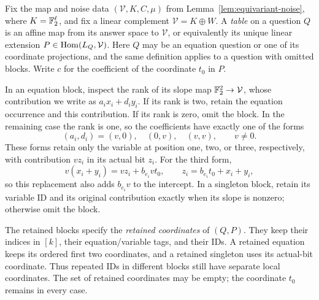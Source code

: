 Fix the map and noise data \((\mathcal V,K,C,\mu)\) from
Lemma~\ref{lem:equivariant-noise}, where \(K=\mathbb F_2^\ell\), and fix a linear
complement \(\mathcal V=K\oplus W\).  A \emph{table} on a question
\(Q\) is an affine map from its answer space to \(\mathcal V\), or
equivalently its unique linear extension
\(P\in\operatorname{Hom}(L_Q,\mathcal V)\).  Here \(Q\) may be an equation
question or one of its coordinate projections, and the same definition
applies to a question with omitted blocks.  Write \(c\) for the
coefficient of the coordinate \(t_0\) in \(P\).

In an equation block, inspect the rank of its slope map
\(\mathbb F_2^2\to\mathcal V\), whose contribution we write as
\(a_i x_i+d_i y_i\).  If its rank is two, retain the equation
occurrence and this contribution.  If its rank is zero, omit the block.
In the remaining case the rank is one, so the coefficients have exactly
one of the forms
\[
 (a_i,d_i)=(v,0),\quad (0,v),\quad (v,v),
 \qquad v\ne0.
\]
These forms retain only the variable at position one, two, or three,
respectively, with contribution \(v z_i\) in its actual bit \(z_i\).
For the third form,
\[
 v(x_i+y_i)=v z_i+b_{e_i}v t_0,
 \qquad z_i=b_{e_i}t_0+x_i+y_i,
\]
so this replacement also adds \(b_{e_i}v\) to the
intercept.  In a singleton block, retain its variable ID and its original
contribution exactly when its slope is nonzero; otherwise omit the block.

The retained blocks specify the \emph{retained coordinates} of \((Q,P)\).  They keep
their indices in \([k]\), their equation/variable tags, and their IDs.
A retained equation keeps its ordered first two coordinates, and a retained
singleton uses its actual-bit coordinate.  Thus repeated IDs in different
blocks still have separate local coordinates.  The set of retained coordinates may be empty;
the coordinate \(t_0\) remains in every case.


